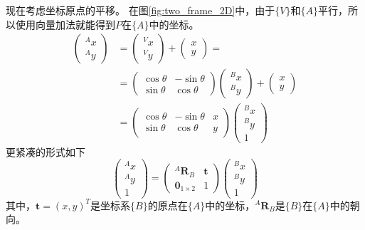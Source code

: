 \documentclass[UTF8,a4paper,10pt]{ctexart}
\begin{document}
现在考虑坐标原点的平移。
在图\ref{fig:two_frame_2D}中，由于$\{V\}$和$\{A\}$平行，所以使用向量加法就能得到$P$在$\{A\}$中的坐标。
\begin{align*}
  \begin{pmatrix}{}^Ax\\{}^Ay\end{pmatrix}
  &=\begin{pmatrix}{}^Vx\\{}^Vy\end{pmatrix}+\begin{pmatrix}x\\y\end{pmatrix}=\\
  &=\begin{pmatrix}\cos\theta  & -\sin\theta\\\sin\theta & \cos\theta\end{pmatrix}
    \begin{pmatrix}{}^Bx\\{}^By\end{pmatrix}+\begin{pmatrix}x\\y\end{pmatrix}\\
  &=\begin{pmatrix}\cos\theta  & -\sin\theta & x\\\sin\theta & \cos\theta & y\end{pmatrix}
    \begin{pmatrix}{}^Bx\\{}^By\\1\end{pmatrix}
\end{align*}
更紧凑的形式如下
\begin{equation}
  \begin{pmatrix}{}^Ax\\{}^Ay\\1\end{pmatrix}=
  \begin{pmatrix}{}^A\mathbf{R}_B & \mathbf{t}\\\mathbf{0}_{1\times2}&1\end{pmatrix}
  \begin{pmatrix}{}^Bx\\{}^By\\1\end{pmatrix}
\end{equation}
其中，$\mathbf{t}=(x,y)^T$是坐标系$\{B\}$的原点在$\{A\}$中的坐标，${}^A\mathbf{R}_B$是$\{B\}$在$\{A\}$中的朝向。
\end{document}
